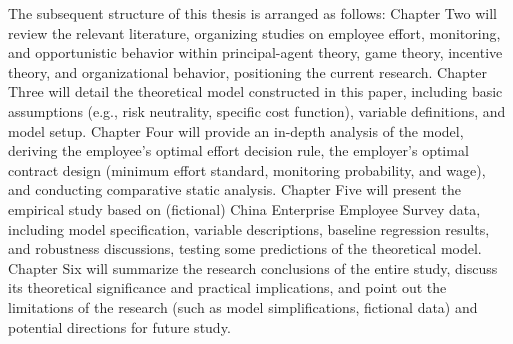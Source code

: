 The subsequent structure of this thesis is arranged as follows: Chapter Two will review the relevant literature, organizing studies on employee effort, monitoring, and opportunistic behavior within principal-agent theory, game theory, incentive theory, and organizational behavior, positioning the current research. Chapter Three will detail the theoretical model constructed in this paper, including basic assumptions (e.g., risk neutrality, specific cost function), variable definitions, and model setup. Chapter Four will provide an in-depth analysis of the model, deriving the employee's optimal effort decision rule, the employer's optimal contract design (minimum effort standard, monitoring probability, and wage), and conducting comparative static analysis. Chapter Five will present the empirical study based on (fictional) China Enterprise Employee Survey data, including model specification, variable descriptions, baseline regression results, and robustness discussions, testing some predictions of the theoretical model. Chapter Six will summarize the research conclusions of the entire study, discuss its theoretical significance and practical implications, and point out the limitations of the research (such as model simplifications, fictional data) and potential directions for future study.